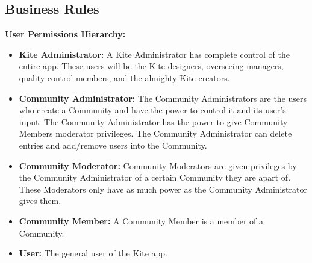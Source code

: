 \documentclass[letterpaper, 10, draftclsnofoot, onecolumn]{IEEEtran}
\begin{document}
\subsection{Business Rules}
\textbf{User Permissions Hierarchy:}
\begin{itemize}
\item \textbf{Kite Administrator: }
\newline
\indent A Kite Administrator has complete control of the entire app. These users will be the Kite designers, overseeing
managers, quality control members, and the almighty Kite creators.
\item \textbf{Community Administrator: }
\newline
\indent The Community Administrators are the users who create a Community and have the power to control it and its user's input. The Community Administrator has the power to give Community Members moderator privileges. The Community Administrator can delete entries and add/remove users into the Community.
\item \textbf{Community Moderator: }
\newline
\indent Community Moderators are given privileges by the Community Administrator of a certain Community they are apart of. These Moderators only have as much power as the Community Administrator gives them.
\item \textbf{Community Member: }
\newline
\indent A Community Member is a member of a Community. 
\item \textbf{User: }
\newline
\indent The general user of the Kite app.
\end{itemize}
\end{document}
